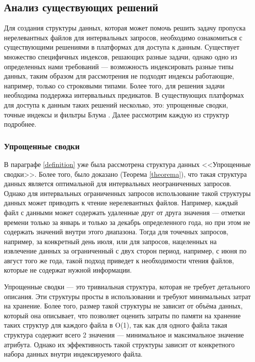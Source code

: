 \subsection{Анализ существующих решений} \label{indexes}

Для создания структуры данных, которая может помочь решить задачу пропуска нерелевантных файлов для интервальных запросов, необходимо ознакомиться с существующими решениями в платформах для доступа к данным. Существует множество специфичных индексов, решающих разные задачи, однако одно из определенных нами требований --- возможность индексировать разные типы данных, таким образом для рассмотрения не подходят индексы работающие, например, только со строковыми типами. Более того, для решения задачи необходима поддержка интервальных предикатов. В существующих платформах для доступа к данным таких решений несколько, это: упрощенные сводки, точные индексы и фильтры Блума \cite{Extensible_data_skipping}. Далее рассмотрим каждую из структур подробнее.

\subsubsection{Упрощенные сводки} 

В параграфе \ref{definition} уже была рассмотрена структура данных {<<Упрощенные сводки>>}. Более того, было доказано (Теорема \ref{theorema}), что такая структура данных является оптимальной для интервальных неограниченных запросов. Однако для интервальных ограниченных запросов использование такой структуры данных может приводить к чтение нерелевантных файлов. Например, каждый файл с данными может содержать удаленные друг от друга значения --- отметки времени только за январь и только за декабрь определенного года, но при этом не содержать значений внутри этого диапазона. Тогда для точечных запросов, например, за конкретный день июля, или для запросов, нацеленных на извлечение данных за ограниченный с двух сторон период, например, с июня по август того же года, такой подход приведет к необходимости чтения файлов, которые не содержат нужной информации.

Упрощенные сводки --- это тривиальная структура, которая не требует детального описания. Эти структуры просты в использовании и требуют минимальных затрат на хранение. Более того, размер такой структуры не зависит от объёма данных, который она описывает, что позволяет оценить затраты по памяти на хранение таких структур для каждого файла в O(1), так как для одного файла такая структура содержит всего 2 значения --- минимальное и максимальное значение атрибута. Однако их эффективность такой структуры зависит от конкретного набора данных внутри индексируемого файла.

